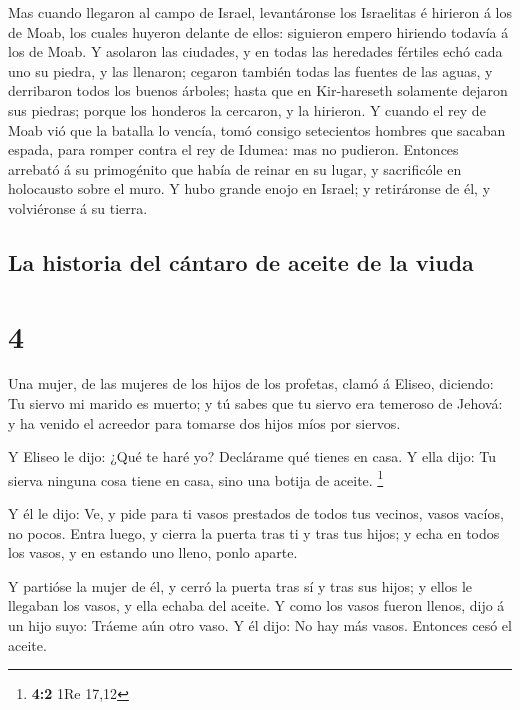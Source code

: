  Mas cuando llegaron al campo de Israel, levantáronse los
Israelitas é hirieron á los de Moab, los cuales huyeron delante de
ellos: siguieron empero hiriendo todavía á los de Moab. 
Y asolaron las ciudades, y en todas las heredades fértiles echó cada uno
su piedra, y las llenaron; cegaron también todas las fuentes de las
aguas, y derribaron todos los buenos árboles; hasta que en Kir-hareseth
solamente dejaron sus piedras; porque los honderos la cercaron, y la
hirieron.  Y cuando el rey de Moab vió que la batalla lo
vencía, tomó consigo setecientos hombres que sacaban espada, para romper
contra el rey de Idumea: mas no pudieron.  Entonces
arrebató á su primogénito que había de reinar en su lugar, y sacrificóle
en holocausto sobre el muro. Y hubo grande enojo en Israel; y
retiráronse de él, y volviéronse á su tierra.

\hypertarget{la-historia-del-cuxe1ntaro-de-aceite-de-la-viuda}{%
\subsection{La historia del cántaro de aceite de la
viuda}\label{la-historia-del-cuxe1ntaro-de-aceite-de-la-viuda}}

\hypertarget{section-3}{%
\section{4}\label{section-3}}

 Una mujer, de las mujeres de los hijos de los profetas,
clamó á Eliseo, diciendo: Tu siervo mi marido es muerto; y tú sabes que
tu siervo era temeroso de Jehová: y ha venido el acreedor para tomarse
dos hijos míos por siervos.

 Y Eliseo le dijo: ¿Qué te haré yo? Declárame qué tienes
en casa. Y ella dijo: Tu sierva ninguna cosa tiene en casa, sino una
botija de aceite. \footnote{\textbf{4:2} 1Re 17,12}

 Y él le dijo: Ve, y pide para ti vasos prestados de todos
tus vecinos, vasos vacíos, no pocos.  Entra luego, y
cierra la puerta tras ti y tras tus hijos; y echa en todos los vasos, y
en estando uno lleno, ponlo aparte.

 Y partióse la mujer de él, y cerró la puerta tras sí y
tras sus hijos; y ellos le llegaban los vasos, y ella echaba del aceite.
 Y como los vasos fueron llenos, dijo á un hijo suyo:
Tráeme aún otro vaso. Y él dijo: No hay más vasos. Entonces cesó el
aceite.

